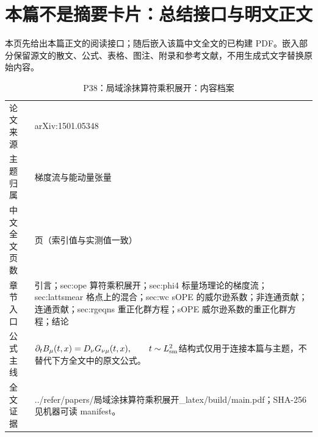 \documentclass[UTF8,11pt,oneside]{ctexbook}
\begin{document}
\section*{本篇不是摘要卡片：总结接口与明文正文}
本页先给出本篇正文的阅读接口；随后嵌入该篇中文全文的已构建 PDF。嵌入部分保留源文的散文、公式、表格、图注、附录和参考文献，不用生成式文字替换原始内容。
\begin{table}[htbp]
  \centering
  \caption{P38：局域涂抹算符乘积展开：内容档案}
  \small
  \begin{tabularx}{0.96\textwidth}{@{}p{3.3cm}>{\raggedright\arraybackslash}X@{}}
    \toprule
    论文来源 & arXiv:1501.05348 \\
    主题归属 & 梯度流与能动量张量 \\
    中文全文页数 & 19 页（索引值与实测值一致） \\
    章节入口 & 引言；sec:ope 算符乘积展开；sec:phi4 标量场理论的梯度流；sec:lattsmear 格点上的混合；sec:wc sOPE 的威尔逊系数；非连通贡献；连通贡献；sec:rgeqns 重正化群方程；sOPE 威尔逊系数的重正化群方程；结论 \\
    公式主线 & $\partial_t B_\mu(t,x)=D_\nu G_{\nu\mu}(t,x),\qquad t\sim L_{\rm sm}^{2}$\newline\scriptsize 结构式仅用于连接本篇与主题，不替代下方全文中的原文公式。 \\
    全文证据 & ../\allowbreak{}refer/\allowbreak{}papers/\allowbreak{}局域涂抹算符乘积展开\_\allowbreak{}latex/\allowbreak{}build/\allowbreak{}main.pdf；SHA-256 见机器可读 manifest。 \\
    \bottomrule
  \end{tabularx}
\end{table}
\end{document}
